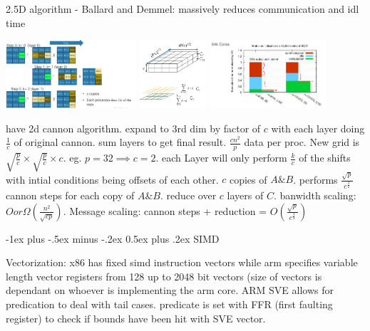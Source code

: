 \documentclass[letter,8pt,landscape]{article}
\makeatletter
\renewcommand{\section}{\@startsection{section}{1}{0mm}%
                                {-1ex plus -.5ex minus -.2ex}%
                                {0.5ex plus .2ex}%
                                {\normalfont\large\bfseries}}
\makeatother
\begin{document}
\begin{multicols}{3}
  2.5D algorithm - Ballard and Demmel:  massively reduces communication and idl
  time
  \begin{center}
    \includegraphics[height=1in]{images/2-5d-circular.jpg}
    \includegraphics[height=1in]{images/2-5d-grid.jpg}
    \includegraphics[height=1in]{images/2-5d-big.jpg}
  \end{center}

  have 2d cannon algorithm. expand to 3rd dim by factor of $c$
  with each layer doing $\frac{1}{c}$ of original cannon. sum layers to get
  final result. $\frac{cn^2}{p}$ data per proc. New grid is $\sqrt{\frac{p}{c}}
  \times \sqrt{\frac{p}{c}}\times c$. eg. $p=32 \implies c=2$. each Layer will
  only perform $\frac{k}{c}$ of the shifts with intial conditions being offsets
  of each other. $c$ copies of $A \& B$. performs
  $\frac{\sqrt{p}}{c^\frac{3}{2}}$ cannon steps for each copy of $A \& B$.
  reduce over $c$ layers of $C$. banwidth scaling: $O or \Omega
  (\frac{n^2}{\sqrt{cp}})$. Message scaling: cannon steps + reduction = 
  $O(\frac{\sqrt{p}}{c^{\frac{3}{2}}})$

  \section{SIMD}

  Vectorization: x86 has fixed simd instruction vectors while arm specifies
  variable length vector registers from 128 up to 2048 bit vectors  (size of
  vectors is dependant on whoever is implementing the arm core. ARM SVE allows for
  predication to deal with tail cases. predicate is set with FFR (first faulting
  register) to check if bounds have been hit with SVE vector.


\end{multicols}
\end{document}
